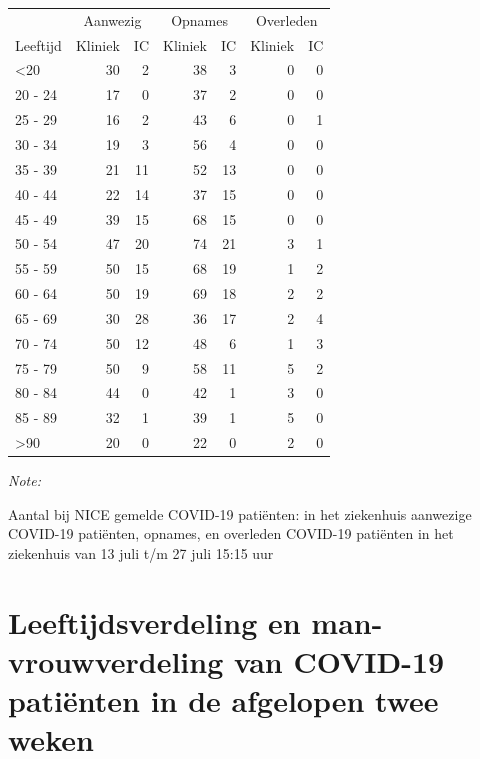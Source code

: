 \documentclass[
  english,
  man,floatsintext]{apa6}
\begin{document}
\begin{table}
\centering\begingroup\fontsize{10}{12}\selectfont

\begin{threeparttable}
\begin{tabular}{lrrrrrr}
\toprule
\multicolumn{1}{c}{ } & \multicolumn{2}{c}{Aanwezig} & \multicolumn{2}{c}{Opnames} & \multicolumn{2}{c}{Overleden} \\
\cmidrule(l{3pt}r{3pt}){2-3} \cmidrule(l{3pt}r{3pt}){4-5} \cmidrule(l{3pt}r{3pt}){6-7}
Leeftijd & Kliniek & IC & Kliniek & IC & Kliniek & IC\\
\midrule
<20 & 30 & 2 & 38 & 3 & 0 & 0\\
20 - 24 & 17 & 0 & 37 & 2 & 0 & 0\\
25 - 29 & 16 & 2 & 43 & 6 & 0 & 1\\
30 - 34 & 19 & 3 & 56 & 4 & 0 & 0\\
35 - 39 & 21 & 11 & 52 & 13 & 0 & 0\\
40 - 44 & 22 & 14 & 37 & 15 & 0 & 0\\
45 - 49 & 39 & 15 & 68 & 15 & 0 & 0\\
50 - 54 & 47 & 20 & 74 & 21 & 3 & 1\\
55 - 59 & 50 & 15 & 68 & 19 & 1 & 2\\
60 - 64 & 50 & 19 & 69 & 18 & 2 & 2\\
65 - 69 & 30 & 28 & 36 & 17 & 2 & 4\\
70 - 74 & 50 & 12 & 48 & 6 & 1 & 3\\
75 - 79 & 50 & 9 & 58 & 11 & 5 & 2\\
80 - 84 & 44 & 0 & 42 & 1 & 3 & 0\\
85 - 89 & 32 & 1 & 39 & 1 & 5 & 0\\
>90 & 20 & 0 & 22 & 0 & 2 & 0\\
\bottomrule
\end{tabular}
\begin{tablenotes}
\item \textit{Note: } 
\item Aantal bij NICE gemelde COVID-19 patiënten: in het ziekenhuis aanwezige COVID-19 patiënten, opnames, en overleden COVID-19 patiënten in het ziekenhuis van 13 juli t/m 27 juli 15:15 uur
\end{tablenotes}
\end{threeparttable}
\endgroup{}
\end{table}

\newpage

\hypertarget{leeftijdsverdeling-en-man-vrouwverdeling-van-covid-19-patiuxebnten-in-de-afgelopen-twee-weken}{%
\section{Leeftijdsverdeling en man-vrouwverdeling van COVID-19 patiënten in de afgelopen twee weken}\label{leeftijdsverdeling-en-man-vrouwverdeling-van-covid-19-patiuxebnten-in-de-afgelopen-twee-weken}}
\end{document}
